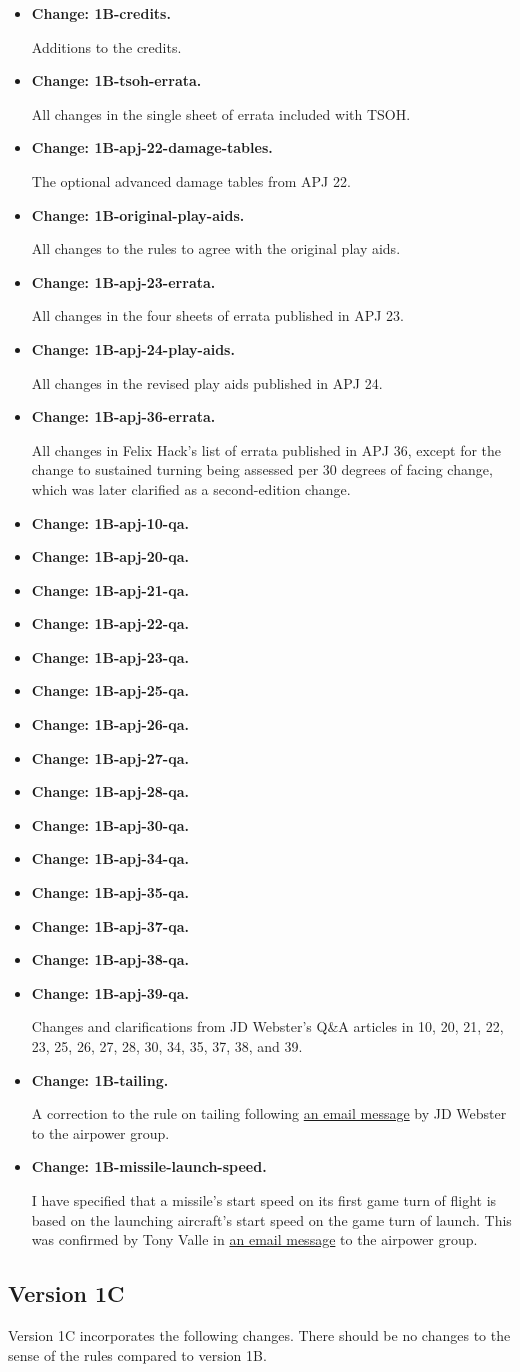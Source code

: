 \documentclass[10pt]{report}
\newcommand{\itemtag}[1]{\item \textbf{Change: #1.}\par}
\begin{document}
\begin{itemize}
    \itemtag{1B-credits} Additions to the credits.
    \itemtag{1B-tsoh-errata} All changes in the single sheet of errata included with TSOH.
    \itemtag{1B-apj-22-damage-tables} The optional advanced damage tables from APJ 22.
    \itemtag{1B-original-play-aids} All changes to the rules to agree with the original play aids.
    \itemtag{1B-apj-23-errata} All changes in the four sheets of errata published in APJ 23.
    \itemtag{1B-apj-24-play-aids} All changes in the revised play aids published in APJ 24. 
    \itemtag{1B-apj-36-errata} All changes in Felix Hack’s list of errata published in APJ 36, except for the change to sustained turning being assessed per 30 degrees of facing change, which was later clarified as a second-edition change.
    \itemtag{1B-apj-10-qa} 
    \itemtag{1B-apj-20-qa} 
    \itemtag{1B-apj-21-qa} 
    \itemtag{1B-apj-22-qa} 
    \itemtag{1B-apj-23-qa} 
    \itemtag{1B-apj-25-qa} 
    \itemtag{1B-apj-26-qa} 
    \itemtag{1B-apj-27-qa} 
    \itemtag{1B-apj-28-qa} 
    \itemtag{1B-apj-30-qa} 
    \itemtag{1B-apj-34-qa} 
    \itemtag{1B-apj-35-qa} 
    \itemtag{1B-apj-37-qa} 
    \itemtag{1B-apj-38-qa} 
    \itemtag{1B-apj-39-qa} 
    Changes and clarifications from JD Webster’s Q\&A articles in {\APJ} 10, 20, 21, 22, 23, 25, 26, 27, 28, 30, 34, 35, 37, 38, and 39.
    \itemtag{1B-tailing} A correction to the rule on tailing following \href{https://airpower.groups.io/g/main/message/2847}{an email message} by JD Webster to the airpower group. 
    \itemtag{1B-missile-launch-speed} I have specified that a missile's start speed on its first game turn of flight is based on the launching aircraft's start speed on the game turn of launch. This was confirmed by Tony Valle in \href{https://airpower.groups.io/g/main/message/3104}{an email message} to the airpower group.
\end{itemize}

\subsection{Version 1C}

Version 1C incorporates the following changes. There should be no changes to the sense of the rules compared to version 1B.
\end{document}
